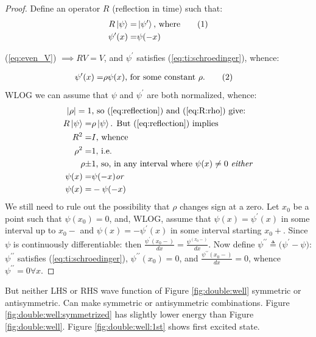 \documentclass[]{article}
\newcommand\numberthis{\addtocounter{equation}{1}\tag{\theequation}}
\begin{document}
\begin{proof}
	Define an operator $R$ (reflection in time) such that:
	\begin{align*}
		R \ket{\psi} =& \ket{\psi^{\prime}} \text{, where} \numberthis \label{eq:reflection}\\
		\psi^{\prime}(x) =& \psi(-x)
	\end{align*}
	
	(\ref{eq:even_V}) $\implies RV=V$, and $\psi^{\prime}$ satisfies (\ref{eq:ti:schroedinger}), whence:
	
	\begin{align*}
	\psi^{\prime}(x) =& \rho \psi(x) \text{, for some constant $\rho$.} \numberthis \label{eq:R:rho}
	\end{align*}
	WLOG we can assume that $\psi$ and $\psi^{\prime}$ are both normalized, whence:
	\begin{align*}
		\lvert \rho \rvert = 1& \text{, so (\ref{eq:reflection}) and (\ref{eq:R:rho}) give:}\\
		R \ket{\psi} =& \rho \ket{\psi} \text{. But (\ref{eq:reflection}) implies}\\
		R^2    =& I \text{, whence}\\
		\rho^2 =& 1 \text{, i.e.}\\
		\rho \pm& 1 \text{, so, in any interval where $\psi(x)\ne 0$ \emph{either}}\\
		\psi(x) =& \psi(-x) \text{\emph{or}}\\
		\psi(x) =& -\psi(-x)
	\end{align*}
	We still need to rule out the possibility that $\rho$ changes sign at a zero. Let $x_0$ be a point such that $\psi(x_0)=0$, and, WLOG, assume that $\psi(x)=\psi^{\prime}(x)$ in some interval up to $x_0-$ and $\psi(x)=-\psi^{\prime}(x)$ in some interval starting $x_0+$. Since $\psi$ is continuously differentiable: then $\frac{\psi^{\prime}(x_0-)}{dx}=\frac{\psi^(x_0-)}{dx}$. Now define $\psi^{\prime\prime} \triangleq \big(\psi^{\prime}-\psi\big)$: $\psi^{\prime\prime}$ satisfies (\ref{eq:ti:schroedinger}), $\psi^{\prime\prime}(x_0)=0$, and $\frac{\psi^{\prime\prime}(x_0-)}{dx}=0$, whence $\psi^{\prime\prime}=0 \forall x$. 
\end{proof}

But neither LHS or RHS wave function of Figure \ref{fig:double:well} symmetric or antisymmetric. Can make symmetric or antisymmetric combinations. Figure \ref{fig:double:well:symmetrized} has slightly lower energy than Figure \ref{fig:double:well}. Figure \ref{fig:double:well:1st} shows first excited state.
\end{document}
